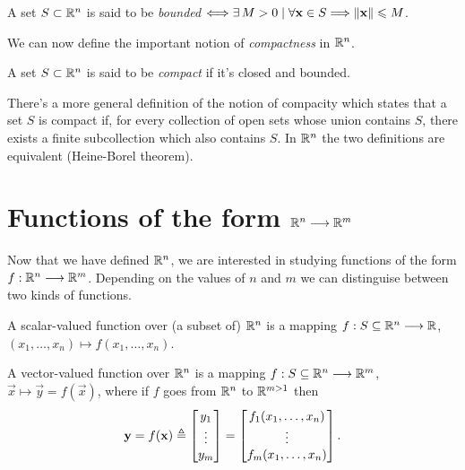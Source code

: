 \begin{defn}\label{def:bounded-set}
A set $S\subset\Rtn$ is said to be \textit{bounded} $\iff\exists M > 0\st\forall\vec{x}\in S\implies \vnorm{\vec{x}}\leq M$.
\end{defn}

We can now define the important notion of \textit{compactness} in $\Rtn$.

\begin{defn}\label{def:compact-set}
A set $S\subset\Rtn$ is said to be \textit{compact} if it's closed and bounded.
\end{defn}

\begin{note}
    There's a more general definition of the notion of compacity which states that a set $S$ is compact if, for every
    collection of open sets whose union contains $S$, there exists a finite subcollection which also contains $S$.
    In $\Rtn$ the two definitions are equivalent (Heine-Borel theorem).
\end{note}




\section{Functions of the form $\Rtn\longrightarrow\R^m$}
Now that we have defined $\Rtn$, we are interested in studying functions of the form $\stdvf$. Depending on the values of 
$n$ and $m$ we can distinguise between two kinds of functions.

\begin{defn}\label{def:scalar-function}
	A scalar-valued function over (a subset of) $\Rtn$ is a mapping $\appl{f}{S\subseteq\Rtn}{\R}$, $\left(x_1, \ldots, x_n\right)
	\longmapsto f\left(x_1, \ldots, x_n\right)$.
\end{defn}

\begin{defn}
	A vector-valued function over $\Rtn$ is a mapping $\appl{f}{S\subseteq\Rtn}{\R^m}$, $\vec{x}\longmapsto\vec{y} = f(\vec{x})$, where
	if $f$ goes from $\Rtn$ to $\R^{m>1}$ then
	\begin{equation}
		\mathbf{y} = f(\mathbf{x})\triangleq\begin{bmatrix}y_1 \\ \vdots \\ y_m \end{bmatrix} = \begin{bmatrix}f_1(x_1, \ldots, x_n) \\
		\vdots \\ f_m(x_1, \ldots, x_n)\end{bmatrix}.
	\end{equation}
\end{defn}

